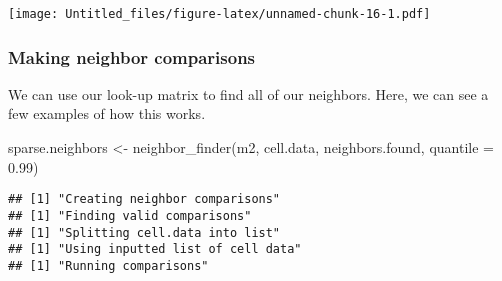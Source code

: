 \documentclass[
]{article}
\newenvironment{Shaded}{\begin{snugshade}}{\end{snugshade}}
\newcommand{\AttributeTok}[1]{\textcolor[rgb]{0.77,0.63,0.00}{#1}}
\newcommand{\FloatTok}[1]{\textcolor[rgb]{0.00,0.00,0.81}{#1}}
\newcommand{\FunctionTok}[1]{\textcolor[rgb]{0.00,0.00,0.00}{#1}}
\newcommand{\NormalTok}[1]{#1}
\newcommand{\OtherTok}[1]{\textcolor[rgb]{0.56,0.35,0.01}{#1}}
\begin{document}
\texttt{[image: Untitled\_files/figure-latex/unnamed-chunk-16-1.pdf]}

\hypertarget{making-neighbor-comparisons}{%
\subsubsection{Making neighbor
comparisons}\label{making-neighbor-comparisons}}

We can use our look-up matrix to find all of our neighbors. Here, we can
see a few examples of how this works.

\begin{Shaded}
\begin{Highlighting}[]
\NormalTok{sparse.neighbors }\OtherTok{\textless{}{-}} \FunctionTok{neighbor\_finder}\NormalTok{(m2, cell.data, neighbors.found, }\AttributeTok{quantile =} \FloatTok{0.99}\NormalTok{)}
\end{Highlighting}
\end{Shaded}

\begin{verbatim}
## [1] "Creating neighbor comparisons"
## [1] "Finding valid comparisons"
## [1] "Splitting cell.data into list"
## [1] "Using inputted list of cell data"
## [1] "Running comparisons"
\end{verbatim}
\end{document}
